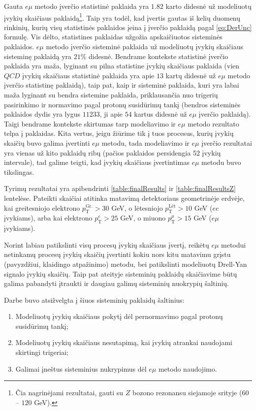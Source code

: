 \documentclass[a4paper, 12pt]{article}
\newcommand{\pT}{p_{\mathrm{T}}}
\newcommand{\QCD}{QC\! D}
\newlength\q
\begin{document}
Gauta $e\mu$ metodo įverčio statistinė paklaida yra $1.82$ karto didesnė už modeliuotų įvykių skaičiaus paklaidą\footnote{Čia nagrinėjami rezultatai, gauti su $Z$ bozono rezonansu siejamoje srityje ($60$ -- $120$ GeV).}. Taip yra todėl, kad įvertis gautas iš kelių duomenų rinkinių, kurių visų statistinės paklaidos įeina į įverčio paklaidą pagal \eqref{eq:DerUnc} formulę. Vis dėlto, statistines paklaidas užgožia apskaičiuotos sisteminės paklaidos. $e\mu$ metodo įverčio sisteminė paklaida už modeliuotų įvykių skaičiaus sisteminę paklaidą yra $21\%$ didesnė. Bendrame kontekste statistinė įverčio paklaida yra maža, lyginant su pilna statistine įvykių skaičiaus paklaida (vien $\QCD$ įvykių skaičiaus statistinė paklaida yra apie $13$ kartų didesnė už $e\mu$ metodo įverčio statistinę paklaidą), taip pat, kaip ir sisteminė paklaida, kuri yra labai maža lyginant su bendra sistemine paklaida, priklausančia nuo trigerių pasirinkimo ir normavimo pagal protonų susidūrimų tankį (bendros sisteminės paklaidos dydis yra lygus $11233$, ji apie $54$ kartus didesnė už $e\mu$ įverčio paklaidą). Taigi bendrame kontekste skirtumas tarp modeliavimo ir $e\mu$ metodo rezultato telpa į paklaidas. Kita vertus, jeigu žiūrime tik į tuos procesus, kurių įvykių skaičių buvo galima įvertinti $e\mu$ metodu, tada modeliavimo ir $e\mu$ įverčio rezultatai yra vienas už kito paklaidų ribų (pačios paklaidos persidengia 52 įvykių intervale), tad galime teigti, kad įvykių skaičiaus įvertintimas $e\mu$ metodu buvo tikslingas.

Tyrimų rezultatai yra apibendrinti \ref{table:finalResults} ir \ref{table:finalResultsZ} lentelėse. Pateikti skaičiai atitinka matavimą detektoriaus geometrinėje erdvėje, kai greitesniojo elektrono $\pT^{\mathrm{Gr.}}>30$ GeV, o lėtesniojo $\pT^{\mathrm{Lėt}}>10$ GeV ($ee$ įvykiams), arba kai elektrono $\pT^{e}>25$ GeV, o miuono $\pT^{\mu}>15$ GeV ($e\mu$ įvykiams).

Norint labiau patikslinti visų procesų įvykių skaičiaus įvertį, reikėtų $e\mu$ metodui netinkamų procesų įvykių skaičių įvertinti kokiu nors kitu matavimu grįstu (pavyzdžiui, klaidingo atpažinimo) metodu, bei patikslinti modeliuotų Drell-Yan signalo įvykių skaičių. Taip pat ateityje sisteminių paklaidų skaičiavime būtų galima pabandyti įtraukti ir daugiau galimų sisteminių nuokrypių šaltinių.

Darbe buvo atsižvelgta į šiuos sisteminių paklaidų šaltinius:
\begin{enumerate}
\item Modeliuotų įvykių skaičiaus pokytį dėl pernormavimo pagal protonų susidūrimų tankį;
\item Modeliuotų įvykių skaičiaus nesutapimą, kai įvykių atrankai naudojami skirtingi trigeriai;
\item Galimai įneštus sisteminius nukrypimus dėl $e\mu$ metodo naudojimo.
\end{enumerate}
\end{document}
